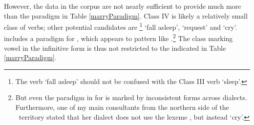 However, the data in the corpus are not nearly sufficient to provide much more than the paradigm in Table \vref{marryParadigm}. %
Class IV is likely a relatively small class of verbs; other potential candidates are \mbox{}\footnote{The verb  ‘fall asleep’ should not be confused with the Class III verb {} ‘sleep’.} %
‘fall asleep’,  ‘request’ and  ‘cry’. \citet[154]{Lehtiranta1992} includes a paradigm for , which appears to pattern like .\footnote{But even the paradigm in \citet[154]{Lehtiranta1992} for  is marked by inconsistent forms across dialects. Furthermore, one of my main consultants from the northern side of the \PS\ territory stated that her dialect does not use the lexeme , but instead  ‘cry’.} 
The class marking vowel in the infinitive form is thus not restricted to the  indicated in Table \vref{marryParadigm}. 

